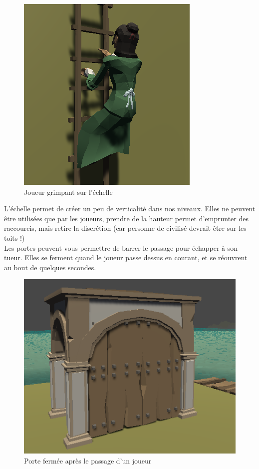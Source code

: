 \documentclass[french, 12pt]{article}
\begin{document}
            \begin{figure}[hbt!]
                \centering
                \includegraphics{ladder.png}
                \caption{Joueur grimpant sur l'échelle}
            \end{figure}

            L'échelle permet de créer un peu de verticalité dans nos niveaux.
            Elles ne peuvent être utilisées que par les joueurs,
            prendre de la hauteur permet d'emprunter des raccourcis, mais retire la discrétion (car personne de civilisé devrait être sur les toits !) \\
            
            Les portes peuvent vous permettre de barrer le passage pour échapper à son tueur. Elles se ferment quand le joueur passe dessus en courant,
            et se réouvrent au bout de quelques secondes.

            \begin{figure}[hbt!]
                \centering
                \includegraphics{doors_closed.png}
                \caption{Porte fermée après le passage d'un joueur}
            \end{figure}
\end{document}
